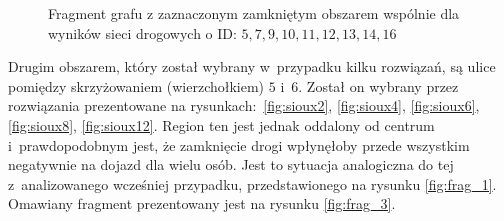 \documentclass[twoside,12pt]{report}
\begin{document}
\begin{figure}[htbp]
\centering
{}
\caption{Fragment grafu z zaznaczonym zamkniętym obszarem wspólnie dla wyników sieci drogowych o ID: $5, 7, 9, 10, 11, 12, 13, 14, 16$}
\label{fig:frag_2}
\end{figure}

Drugim obszarem, który został wybrany w~przypadku kilku rozwiązań, są ulice pomiędzy skrzyżowaniem (wierzchołkiem) $5$ i~$6$. Został on wybrany przez rozwiązania prezentowane na rysunkach:~\ref{fig:sioux2}, \ref{fig:sioux4}, \ref{fig:sioux6}, \ref{fig:sioux8}, \ref{fig:sioux12}. Region ten jest jednak oddalony od centrum i~prawdopodobnym jest, że zamknięcie drogi wpłynęłoby przede wszystkim negatywnie na dojazd dla wielu osób. Jest to sytuacja analogiczna do tej z~analizowanego wcześniej przypadku, przedstawionego na rysunku \ref{fig:frag_1}. Omawiany fragment prezentowany jest na rysunku \ref{fig:frag_3}.
\end{document}
